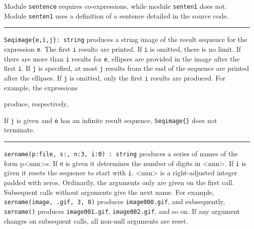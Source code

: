 Module \texttt{sentence} requires co-expressions, while module
\texttt{senten1} does not. Module \texttt{senten1} uses a definition of
a {\textquotedbl}sentence{\textquotedbl} detailed in the source code.

\vspace{0.25cm}\hrule{}

\texttt{Seqimage\{e,i,j\}: string} produces a string image of the result
sequence for the expression \texttt{e}.  The first \texttt{i}
results are printed. If \texttt{i} is omitted, there is no limit. If
there are more than \texttt{i} results for \texttt{e}, ellipses are
provided in the image after the first \texttt{i}. If \texttt{j} is
specified, at most \texttt{j} results from the end of the sequence are
printed after the ellipses. If \texttt{j} is omitted, only the first
\texttt{i} results are produced. For example, the expressions 


\noindent produce, respectively, 


\noindent If \texttt{j} is given and \texttt{e} has an infinite result
sequence, \texttt{Seqimage\{\}} does not terminate.

\vspace{0.25cm}\hrule{}

\texttt{sername(p:{\textquotedbl}file{\textquotedbl},
s:{\textquotedbl}{\textquotedbl}, n:3, i:0) : string} produces a series
of names of the form p{\textless}nnn{\textgreater}s. If \texttt{n} is
given it determines the number of digits in
{\textless}nnn{\textgreater}. If \texttt{i} is given it resets the
sequence to start with \texttt{i}. {\textless}nnn{\textgreater} is a
right-adjusted integer padded with zeros. Ordinarily, the arguments
only are given on the first call. Subsequent calls without arguments
give the next name. For example,
\texttt{sername({\textquotedbl}image{\textquotedbl},
{\textquotedbl}.gif{\textquotedbl}, 3, 0)} produces
\texttt{{\textquotedbl}image000.gif{\textquotedbl}}, and subsequently,
\texttt{sername()} produces
\texttt{{\textquotedbl}image001.gif{\textquotedbl}},
\texttt{{\textquotedbl}image002.gif{\textquotedbl}}, and so on. If any
argument changes on subsequent calls, all non-null arguments are reset.


